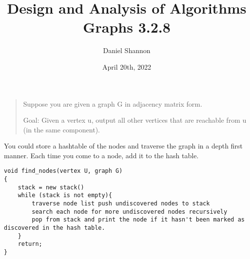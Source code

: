 \documentclass[12pt, letterpaper, twoside]{article}
\title{%
Design and Analysis of Algorithms\\
\large Graphs 3.2.8
}
\author{Daniel Shannon}
\date{April 20th, 2022}
\begin{document}
\begin{titlepage}
\maketitle
\end{titlepage}
\begin{quote}
    Suppose you are given a graph G in adjacency matrix form.

    Goal: Given a vertex u, output all other vertices that are reachable from u (in the same component).    
\end{quote}
You could store a hashtable of the nodes and traverse the graph in a depth first manner. Each time you come to a node, add it to the hash table.

\begin{lstlisting}
void find_nodes(vertex U, graph G)                  
{
    stack = new stack()
    while (stack is not empty){
        traverse node list push undiscovered nodes to stack
        search each node for more undiscovered nodes recursively
        pop from stack and print the node if it hasn't been marked as discovered in the hash table.
    }
    return;
}
\end{lstlisting}
\end{document}
